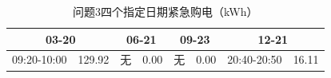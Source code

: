 \begin{table}[H]\centering\small\caption{问题3四个指定日期紧急购电（kWh）}\label{tab:q3e}
\begin{tabular}{lrlrlrlr}\toprule
\multicolumn{2}{c}{03-20} & \multicolumn{2}{c}{06-21} & \multicolumn{2}{c}{09-23} & \multicolumn{2}{c}{12-21}\\\midrule
09:20-10:00 & 129.92 & 无 & 0.00 & 无 & 0.00 & 20:40-20:50 & 16.11\\
\bottomrule\end{tabular}\end{table}
